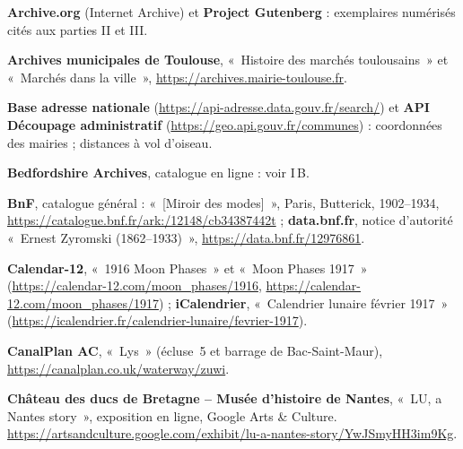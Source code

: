 \begin{biblist}
\item \textbf{Archive.org} (Internet Archive) et \textbf{Project Gutenberg} : exemplaires numérisés cités aux parties II et III.
\item \textbf{Archives municipales de Toulouse}, «~Histoire des marchés toulousains~» et «~Marchés dans la ville~», \url{https://archives.mairie-toulouse.fr}.
\item \textbf{Base adresse nationale} (\url{https://api-adresse.data.gouv.fr/search/}) et \textbf{API Découpage administratif} (\url{https://geo.api.gouv.fr/communes}) : coordonnées des mairies ; distances à vol d'oiseau.
\item \textbf{Bedfordshire Archives}, catalogue en ligne : voir I\,B.
\item \textbf{BnF}, catalogue général : «~[Miroir des modes]~», Paris, Butterick, 1902--1934, \url{https://catalogue.bnf.fr/ark:/12148/cb34387442t} ; \textbf{data.bnf.fr}, notice d'autorité «~Ernest Zyromski (1862--1933)~», \url{https://data.bnf.fr/12976861}.
\item \textbf{Calendar-12}, «~1916 Moon Phases~» et «~Moon Phases 1917~» (\url{https://calendar-12.com/moon_phases/1916}, \url{https://calendar-12.com/moon_phases/1917}) ; \textbf{iCalendrier}, «~Calendrier lunaire février 1917~» (\url{https://icalendrier.fr/calendrier-lunaire/fevrier-1917}).
\item \textbf{CanalPlan AC}, «~Lys~» (écluse~5 et barrage de Bac-Saint-Maur), \url{https://canalplan.co.uk/waterway/zuwi}.
\item \textbf{Château des ducs de Bretagne -- Musée d'histoire de Nantes}, «~LU, a Nantes story~», exposition en ligne, Google Arts \& Culture. \url{https://artsandculture.google.com/exhibit/lu-a-nantes-story/YwJSmyHH3im9Kg}.

\end{biblist}
